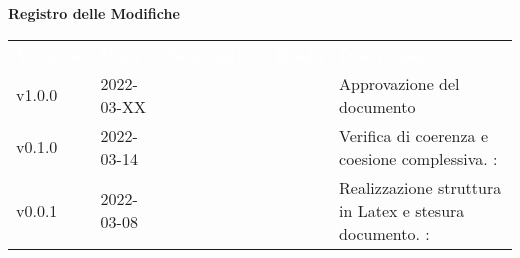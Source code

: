 

{\LARGE{\textbf{Registro delle Modifiche}}} \\
\begin{table}[!htbp]
\renewcommand{\arraystretch}{1.5}
\begin{tabular}{ m{}<{\centering}  m{}<{\centering}  m{}<{\centering}  m{}<{\centering}  m{}<{\centering} }
	\rowcolor{darkblue}
	\textcolor{white}{\textbf{Versione}} &\textcolor{white}{\textbf{Data}}& \textcolor{white}{\textbf{Nominativo}} & \textcolor{white}{\textbf{Ruolo}}&\textcolor{white}{\textbf{Descrizione}}\\ 
	v1.0.0& 2022-03-XX &  & \RE & Approvazione del documento \\

	v0.1.0& 2022-03-14 & \PV & \AN & Verifica di coerenza e coesione complessiva. \VE: \textit{\GC}\\

	v0.0.1& 2022-03-08 & \PV & \AN & Realizzazione struttura in Latex e stesura documento. \VE: \textit{\GC}\\

\end{tabular}
\end{table}

\pagebreak